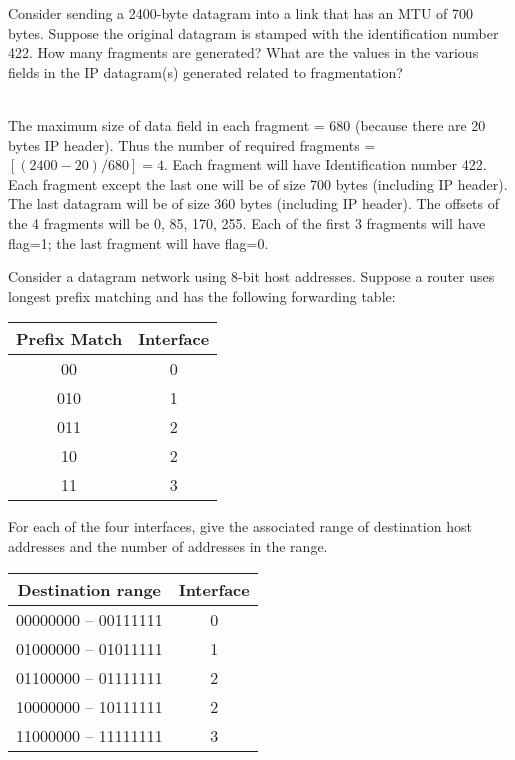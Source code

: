 \documentclass[answers,addpoints]{exam}
\begin{document}
\begin{questions}
\question 
Consider sending a 2400-byte datagram into a link that has an MTU of 700 bytes. Suppose the original datagram is stamped with the identification number 422. How many fragments are generated? What are the values in the various fields in the IP datagram(s) generated related to fragmentation?
\vspace{3in}

\begin{solution} \\
The maximum size of data field in each fragment = 680 (because there are 20 bytes IP header). Thus the number of required fragments = $[(2400-20)/680]=4$. Each fragment will have Identification number 422. Each fragment except the last one will be of size 700 bytes (including IP header). The last datagram will be of size 360 bytes (including IP header). The offsets of the 4 fragments will be 0, 85, 170, 255. Each of the first 3 fragments will have flag=1; the last fragment will have flag=0.
\end{solution} 


\question 
Consider a datagram network using 8-bit host addresses. Suppose a router uses longest prefix matching and has the following forwarding table:
\begin{center}
 \begin{tabular}{|c | c|} 
 \hline
 Prefix Match & Interface \\ [0.5ex] 
 \hline
 00 & 0 \\ 
 \hline
 010 & 1 \\
 \hline
 011 & 2 \\
 \hline
 10 & 2 \\
 \hline
 11 & 3 \\ [1ex] 
 \hline
\end{tabular}
\end{center}

For each of the four interfaces, give the associated range of destination host addresses and the number of addresses in the range.
\fillwithdottedlines{2in}
\begin{solution}
\begin{center}
 \begin{tabular}{|c | c|} 
 \hline
 Destination range & Interface \\ [0.5ex] 
 \hline
 00000000 – 00111111 & 0 \\ 
 \hline
 01000000 – 01011111 & 1 \\
 \hline
 01100000 – 01111111 & 2 \\
 \hline
 10000000 – 10111111 & 2 \\
 \hline
 11000000 – 11111111 & 3 \\ [1ex] 
 \hline
\end{tabular}
\end{center}
\end{solution} 



\end{questions}
\end{document}
